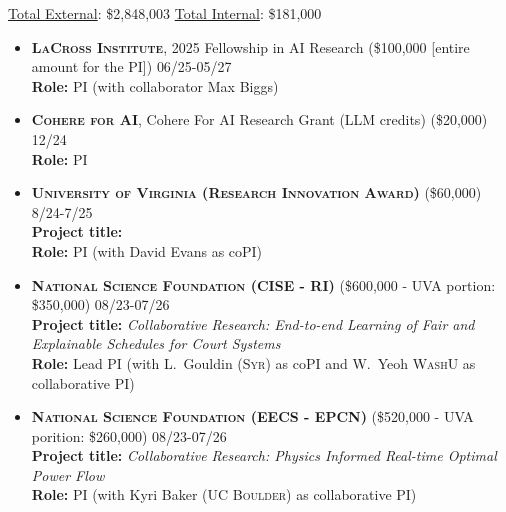 
\begin{keywords}
{\underline{Total External}: \$2,848,003 %
\hspace{8pt} \underline{Total Internal}: \$181,000}%
\end{keywords}

\begin{itemize}
	\item \textbf{\textsc{LaCross Institute}}, 
	2025 Fellowship in AI Research 
	(\$100,000 [entire amount for the PI]) \hfill \textsc{06/25-05/27}\\
	{\bf Role:} PI (with collaborator Max Biggs)

	\item \textbf{\textsc{Cohere for AI}}, 
	Cohere For AI Research Grant (LLM credits) (\$20,000) \hfill \textsc{12/24}\\
	{\bf Role:} PI

	\item \textbf{\textsc{University of Virginia (Research Innovation Award)}}
	(\$60,000)
	\hfill \textsc{8/24-7/25}\\
	{\bf Project title:} \\
	{\bf Role:} PI (with David Evans as coPI)

	\item 
	\textbf{\textsc{National Science Foundation (CISE - RI)}}
	(\$600,000 - UVA portion: \$350,000)
	\hfill \textsc{08/23-07/26}\\
	{\bf Project title:} 
	{\em Collaborative Research: End-to-end Learning of Fair and Explainable Schedules for Court Systems}\\
	{\bf Role:} Lead PI (with L.~Gouldin (\textsc{Syr}) as coPI and W.~Yeoh \textsc{WashU} as collaborative PI)

	\item
	\textbf{\textsc{National Science Foundation (EECS - EPCN)}}
	(\$520,000 - UVA porition: \$260,000)
	\hfill \textsc{08/23-07/26}\\
	{\bf Project title:} 
	{\em Collaborative Research: Physics Informed Real-time Optimal Power Flow}\\
	{\bf Role:} PI (with Kyri Baker (\textsc{UC Boulder}) as collaborative PI)
	

\end{itemize}
